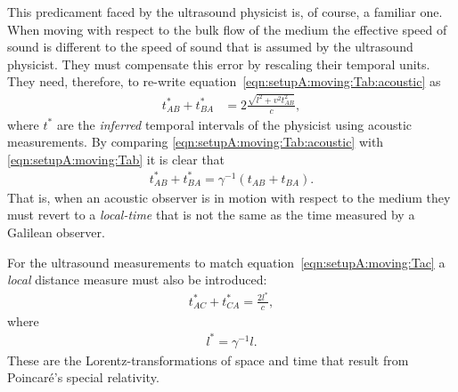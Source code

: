 \documentclass[10pt, fleqn,final,showtrims,oldfontcommands]{article} %
\newcommand{\eqnref}[1]{\ref{eqn:#1}}
\newcommand{\lr}[1]{\left( #1 \right)}
\newcommand{\Poincare}{Poincar{\'e}}
\begin{document}
This predicament faced by the ultrasound physicist  is, of course, a familiar one.
When moving with respect to the bulk flow of the medium the effective speed of sound is different 
to the speed of sound that is assumed by the ultrasound physicist.
They must compensate this error by rescaling their temporal units.
They need, therefore, to re-write equation~\ref{eqn:setupA:moving:Tab:acoustic} as
\begin{align}
 t_{AB}^\ast+t_{BA}^\ast  &= 2\frac{\sqrt{l^2+v^2t_{AB}^2}}{c},\label{eqn:setupA:moving:Tab:acoustic}
\end{align}
where $t^\ast$ are the {\em inferred} temporal intervals of the physicist using acoustic measurements.
By comparing \eqnref{setupA:moving:Tab:acoustic} with \eqnref{setupA:moving:Tab} it is clear that
\begin{align}
 t_{AB}^\ast+t_{BA}^\ast = \gamma^{-1}\lr{t_{AB}+t_{BA}}.
\end{align}
That is, when an acoustic observer is in motion with respect to the medium 
they must revert to a {\em local-time} that is not the same as the time measured by a Galilean observer.

For the ultrasound measurements to match equation~\ref{eqn:setupA:moving:Tac} 
a {\em local} distance measure must also be introduced: %
\begin{align}
  t_{AC}^\ast+t_{CA}^\ast = \frac{2l^\ast}{c},
\end{align}
where 
\begin{align}
l^\ast = \gamma^{-1} l.
\end{align}
These are the Lorentz-transformations of space and time that result from \Poincare's special relativity.
\end{document}
